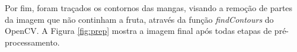 \begin{figure}[H]
\end{figure}

Por fim, foram traçados os contornos das mangas, visando a remoção de partes da imagem que não continham a fruta, através da função \textit{findContours} do OpenCV. A Figura \ref{fig:prep} mostra a imagem final após todas etapas de pré-processamento.


